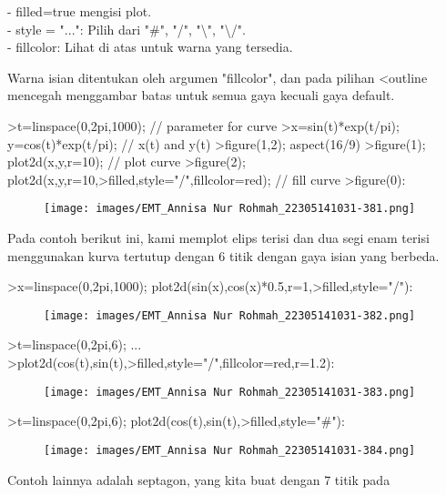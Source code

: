 \documentclass[a4paper,10pt]{article}
\begin{document}
\begin{eulernotebook}
\begin{eulercomment}
- filled=true mengisi plot.\\
- style = "...": Pilih dari "#", "/", "\textbackslash{}", "\textbackslash{}/".\\
- fillcolor: Lihat di atas untuk warna yang tersedia.

Warna isian ditentukan oleh argumen "fillcolor", dan pada pilihan
\textless{}outline mencegah menggambar batas untuk semua gaya kecuali gaya
default.
\end{eulercomment}
\begin{eulerprompt}
>t=linspace(0,2pi,1000); // parameter for curve
>x=sin(t)*exp(t/pi); y=cos(t)*exp(t/pi); // x(t) and y(t)
>figure(1,2); aspect(16/9)
>figure(1); plot2d(x,y,r=10); // plot curve
>figure(2); plot2d(x,y,r=10,>filled,style="/",fillcolor=red); // fill curve
>figure(0):
\end{eulerprompt}
\begin{figure}[h]
    \centering
    \texttt{[image: images/EMT\_Annisa Nur Rohmah\_22305141031-381.png]}
\end{figure}\begin{eulercomment}
Pada contoh berikut ini, kami memplot elips terisi dan dua segi enam
terisi menggunakan kurva tertutup dengan 6 titik dengan gaya isian
yang berbeda.
\end{eulercomment}
\begin{eulerprompt}
>x=linspace(0,2pi,1000); plot2d(sin(x),cos(x)*0.5,r=1,>filled,style="/"):
\end{eulerprompt}
\begin{figure}[h]
    \centering
    \texttt{[image: images/EMT\_Annisa Nur Rohmah\_22305141031-382.png]}
\end{figure}
\begin{eulerprompt}
>t=linspace(0,2pi,6); ...
>plot2d(cos(t),sin(t),>filled,style="/",fillcolor=red,r=1.2):
\end{eulerprompt}
\begin{figure}[h]
    \centering
    \texttt{[image: images/EMT\_Annisa Nur Rohmah\_22305141031-383.png]}
\end{figure}
\begin{eulerprompt}
>t=linspace(0,2pi,6); plot2d(cos(t),sin(t),>filled,style="#"):
\end{eulerprompt}
\begin{figure}[h]
    \centering
    \texttt{[image: images/EMT\_Annisa Nur Rohmah\_22305141031-384.png]}
\end{figure}
\begin{eulercomment}
Contoh lainnya adalah septagon, yang kita buat dengan 7 titik pada

\end{eulercomment}
\end{eulernotebook}
\end{document}
